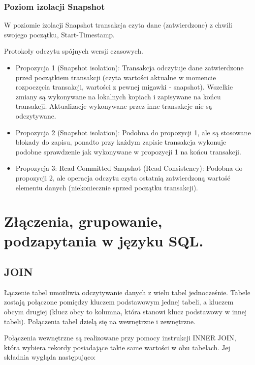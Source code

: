 \documentclass[12pt]{article}
\begin{document}
    \subsubsection{Poziom izolacji Snapshot}
    
    W poziomie izolacji Snapshot transakcja czyta dane (zatwierdzone) z chwili swojego
    początku, Start-Timestamp.

    Protokoły odczytu spójnych wersji czasowych.
    \begin{itemize}
        \item Propozycja 1 (Snapshot isolation): Transakcja odczytuje dane zatwierdzone przed początkiem
        transakcji (czyta wartości aktualne w momencie rozpoczęcia transakcji, wartości z pewnej
        migawki - snapshot). Wszelkie zmiany są wykonywane na lokalnych kopiach i zapisywane na
        końcu transakcji. Aktualizacje wykonywane przez inne transakcje nie są odczytywane.
        \item Propozycja 2 (Snapshot isolation):
        Podobna do propozycji 1, ale są stosowane blokady do zapisu, ponadto przy każdym zapisie
        transakcja wykonuje podobne sprawdzenie jak wykonywane w propozycji 1 na końcu
        transakcji.
        \item Propozycja 3: Read Committed Snapshot (Read Consistency):
        Podobna do propozycji 2, ale operacja odczytu czyta ostatnią zatwierdzoną wartość
        elementu danych (niekoniecznie sprzed początku transakcji).
    \end{itemize}

    \newpage
    
    \section{Złączenia, grupowanie, podzapytania w języku SQL.}
    
    \subsection{JOIN}
    Łączenie tabel umożliwia odczytywanie danych z wielu tabel jednocześnie. Tabele zostają połączone pomiędzy kluczem podstawowym jednej tabeli, a kluczem obcym drugiej (klucz obcy to kolumna, która stanowi klucz podstawowy w innej tabeli). Połączenia tabel dzielą się na wewnętrzne i zewnętrzne.
    
    Połączenia wewnętrzne są realizowane przy pomocy instrukcji INNER JOIN, która wybiera rekordy posiadające takie same wartości w obu tabelach. Jej składnia wygląda następująco:
    
\end{document}
